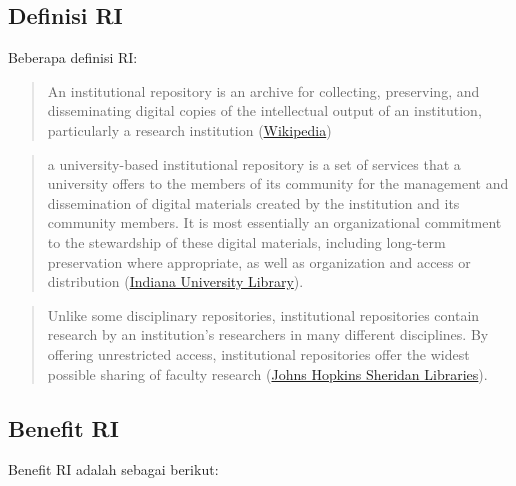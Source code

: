 \documentclass[a4paper]{article}
\begin{document}
\subsection{Definisi RI}

Beberapa definisi RI:

\begin{quotation} 
An institutional repository is an archive for collecting, preserving, and disseminating digital copies of the intellectual output of an institution, particularly a research institution (\href{https://en.wikipedia.org/wiki/Institutional_repository}{Wikipedia}) 
\end{quotation} 

\begin{quotation} a university-based institutional repository is a set of services that a university offers to the members of its community for the management and dissemination of digital materials created by the institution and its community members. It is most essentially an organizational commitment to the stewardship of these digital materials, including long-term preservation where appropriate, as well as organization and access or distribution (\href{https://blogs.libraries.indiana.edu/scholcomm/2011/08/23/2-what-is-an-institutional-repository/}{Indiana University Library}). 
\end{quotation}

\begin{quotation}
Unlike some disciplinary repositories, institutional repositories contain research by an institution's researchers in many different disciplines. By offering unrestricted access, institutional repositories offer the widest possible sharing of faculty research (\href{http://guides.library.jhu.edu/c.php?g=202599&p=1335149}{Johns Hopkins Sheridan Libraries}). 
\end{quotation}

\subsection{Benefit RI}

Benefit RI adalah sebagai berikut: 
\end{document}
